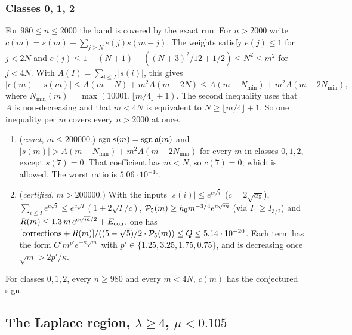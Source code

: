 \subsubsection{Classes 0, 1, 2}\label{sec:t-band012}
For $980\le n\le2000$ the band is covered by the exact run. For $n>2000$ write $c(m)=s(m)+\sum_{j\ge N}e(j)s(m-j)$. The
weights satisfy $e(j)\le1$ for $j<2N$ and $e(j)\le1+(N+1)+((N+3)^2/12+1/2)\le N^2\le m^2$ for $j<4N$. With
$A(I)=\sum_{i\le I}|s(i)|$, this gives
\[
|c(m)-s(m)|\le A(m-N)+m^2A(m-2N)\le A(m-N_{\min})+m^2A(m-2N_{\min}),
\]
where $N_{\min}(m)=\max(10001,\lfloor m/4\rfloor+1)$.
The second inequality uses that $A$ is non-decreasing and that $m<4N$ is equivalent to $N\ge\lfloor m/4\rfloor+1$. So one
inequality per $m$ covers every $n>2000$ at once.

\begin{lemma}\label{lem:t-band012}
\begin{enumerate}
\item[(A)] (\emph{exact}, $m\le200000$.) $\operatorname{sgn} s(m)=\operatorname{sgn}\mathfrak a(m)$ and $|s(m)|>A(m-N_{\min})+m^2A(m-2N_{\min})$ for every $m$
in classes $0,1,2$, except $s(7)=0$. That coefficient has $m<N$, so $c(7)=0$, which is allowed. The worst ratio is
$5.06\cdot10^{-10}$.
\item[(B)] (\emph{certified}, $m>200000$.) With the inputs $|s(i)|\le e^{c\sqrt i}$ ($c=2\sqrt{a_5}$),
$\sum_{i\le I}e^{c\sqrt i}\le e^{c\sqrt I}(1+2\sqrt I/c)$, $\mathcal P_5(m)\ge h_0m^{-3/4}e^{c\sqrt m}$ (via $I_1\ge I_{3/2}$) and
$R(m)\le1.3\,m\,e^{c\sqrt m/2}+E_{\mathrm{con}}$, one has
$[\text{corrections}+R(m)]/((5-\sqrt5)/2\cdot \mathcal P_5(m))\le Q\le5.14\cdot10^{-20}$. Each term has the form
$C'm^{p'}e^{-\kappa\sqrt m}$ with $p'\in\{1.25,3.25,1.75,0.75\}$, and is decreasing once $\sqrt m>2p'/\kappa$.
\end{enumerate}
\end{lemma}

\begin{corollary}\label{cor:t-band012}
For classes $0,1,2$, every $n\ge980$ and every $m<4N$, $c(m)$ has the conjectured sign.
\end{corollary}

\subsection{The Laplace region, \texorpdfstring{$\lambda\ge4$, $\mu<0.105$}{lambda >= 4, mu < 0.105}}\label{sec:t-laplace}

